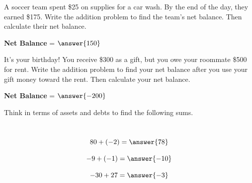 \documentclass{ximera}[font=12pt]
\begin{document}
\begin{problem}
A soccer team spent \$25 on supplies for a car wash.  By the end of the day, they earned \$175. Write the addition problem to find 
the team's net balance.  Then calculate their net balance. 


\begin{multipleChoice}
\end{multipleChoice}


\textcolor{orange!75!black}{\textbf{Net Balance}} = $\answer{150}$


\end{problem}


\begin{problem}
It's your birthday!  You receive \$300 as a gift, but you owe your roommate \$500 for rent. Write the addition problem to 
find your net balance after you use your gift money toward the rent.  Then calculate your net balance.

\begin{multipleChoice}
\end{multipleChoice}

\textcolor{orange!75!black}{\textbf{Net Balance}} = $\answer{-200}$

\end{problem}

\begin{problem}
Think in terms of assets and debts to find the following sums. 

~ \\[0.5em]

\[ 80 + (-2)  =\answer{78} \]

\[ -9 + (-1)  =\answer{-10} \]

\[ -30 + 27 =\answer{-3}\]

\end{problem}
\end{document}
